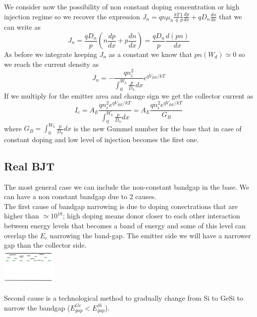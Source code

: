 We consider now the possibility of non constant doping concentration or high injection regime so we recover the expression $J_n=qn\mu_n \frac{kT}{q}\frac{1}{p}\frac{dp}{dx}+qD_n \frac{dn}{dx}$ that we can write as
\begin{equation}
J_n=\frac{qD_n}{p}\left(n \frac{dp}{dx}+p \frac{dn}{dx}\right)= \frac{qD_n}{p}\frac{d(pn)}{dx}
\end{equation}
As before we integrate keeping $J_n$ as a constant we know that $pn(W_d)\simeq 0$ so we reach the current density as 
\begin{equation}
J_n=-\frac{qn_i^2}{\int^{W_b}_0 \frac{p}{D_n}dx}e^{qV_{BE}/kT}
\end{equation}
If we multiply for the emitter area and change sign we get the collector current as 
\begin{equation}
I_c=A_E\frac{qn_i^2 e^{qV_{BE}/kT}}{\int^{W_b}_0 \frac{p}{D_n}dx}=A_E\frac{qn_i^2 e^{qV_{BE}/kT}}{G_B}
\end{equation}
where $G_B=\int^{W_b}_0 \frac{p}{D_n}dx$ is the new Gummel number for the base that in case of constant doping and low level of injection becomes the first one.\\

\subsection{Real BJT}

The most general case we can include the non-constant bandgap in the base. We can have a non constant bandgap due to 2 causes.\\
The first cause of bandgap narrowing is due to doping conectrations that are higher than $\simeq 10^{18}$; high doping means donor closer to each other interaction between energy levels that becomes a band of energy and some of this level can overlap the $E_c$ narrowing the band-gap. The emitter side we will have a narrower gap than the collector side.\\

\centering
\includegraphics[width=0.2\textwidth]{bjt5.png}\\
\raggedright

Second cause is a technological method to gradually change from Si to GeSi to narrow the bandgap ($E_{gap}^{Ge}<E_{gap}^{Si}$).

